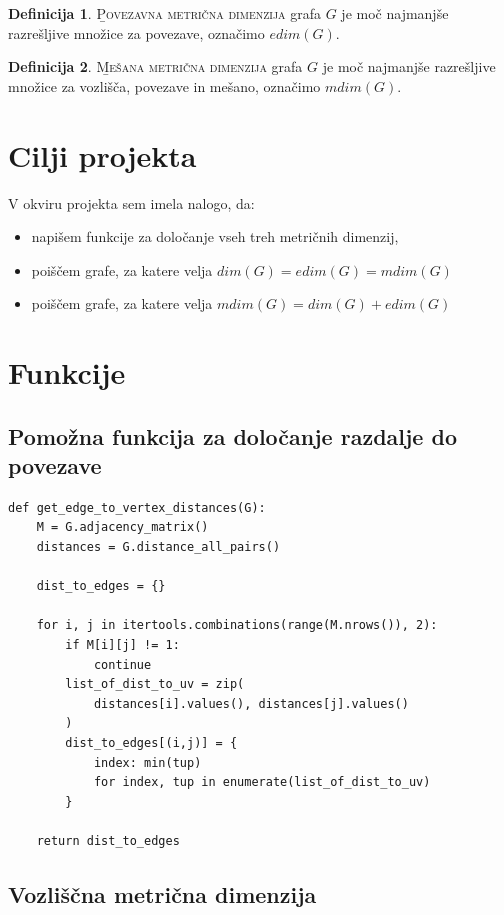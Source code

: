 \documentclass[a4paper,12pt]{article}
\theoremstyle{definition}
\newtheorem{definicija}{Definicija}[section]
\theoremstyle{remark}
\theoremstyle{definition}
\begin{document}
\begin{definicija}
    \textsc\b{Povezavna metrična dimenzija} grafa $G$ je moč najmanjše
    razrešljive množice za povezave, označimo $edim(G)$.
\end{definicija}

\begin{definicija}
    \textsc\b{Mešana metrična dimenzija} grafa $G$ je moč najmanjše
    razrešljive množice za vozlišča, povezave in mešano, označimo $mdim(G)$.
\end{definicija}

\section*{Cilji projekta}

V okviru projekta sem imela nalogo, da:
\begin{itemize}
    \item napišem funkcije za določanje vseh treh metričnih dimenzij,
    \item poiščem grafe, za katere velja $dim(G)=edim(G)=mdim(G)$
    \item poiščem grafe, za katere velja $mdim(G)=dim(G)+edim(G)$
\end{itemize}

\newpage
\section*{Funkcije}

\subsection*{Pomožna funkcija za določanje razdalje do povezave}
\begin{lstlisting}
def get_edge_to_vertex_distances(G):
    M = G.adjacency_matrix()
    distances = G.distance_all_pairs()

    dist_to_edges = {}

    for i, j in itertools.combinations(range(M.nrows()), 2):
        if M[i][j] != 1:
            continue
        list_of_dist_to_uv = zip(
            distances[i].values(), distances[j].values()
        )
        dist_to_edges[(i,j)] = {
            index: min(tup)
            for index, tup in enumerate(list_of_dist_to_uv)
        }

    return dist_to_edges
\end{lstlisting}


\subsection*{Vozliščna metrična dimenzija}
\end{document}
